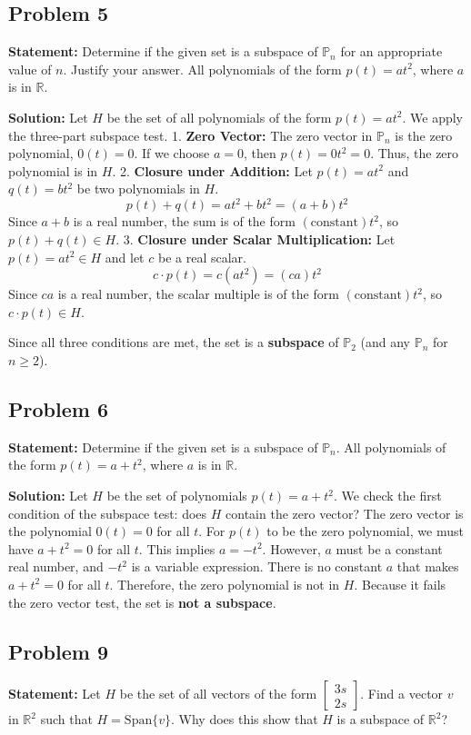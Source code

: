 \documentclass[12pt]{article}
\begin{document}
\subsection{Problem 5}
\textbf{Statement:} Determine if the given set is a subspace of $\mathbb{P}_n$ for an appropriate value of $n$. Justify your answer.
All polynomials of the form $p(t) = at^2$, where $a$ is in $\mathbb{R}$.

\textbf{Solution:}
Let $H$ be the set of all polynomials of the form $p(t) = at^2$. We apply the three-part subspace test.
1. \textbf{Zero Vector:} The zero vector in $\mathbb{P}_n$ is the zero polynomial, $0(t) = 0$. If we choose $a = 0$, then $p(t) = 0t^2 = 0$. Thus, the zero polynomial is in $H$.
2. \textbf{Closure under Addition:} Let $p(t) = at^2$ and $q(t) = bt^2$ be two polynomials in $H$.
\[ p(t) + q(t) = at^2 + bt^2 = (a+b)t^2 \]
Since $a+b$ is a real number, the sum is of the form $(\text{constant})t^2$, so $p(t) + q(t) \in H$.
3. \textbf{Closure under Scalar Multiplication:} Let $p(t) = at^2 \in H$ and let $c$ be a real scalar.
\[ c \cdot p(t) = c(at^2) = (ca)t^2 \]
Since $ca$ is a real number, the scalar multiple is of the form $(\text{constant})t^2$, so $c \cdot p(t) \in H$.

Since all three conditions are met, the set is a \textbf{subspace} of $\mathbb{P}_2$ (and any $\mathbb{P}_n$ for $n \ge 2$).

\subsection{Problem 6}
\textbf{Statement:} Determine if the given set is a subspace of $\mathbb{P}_n$.
All polynomials of the form $p(t) = a + t^2$, where $a$ is in $\mathbb{R}$.

\textbf{Solution:}
Let $H$ be the set of polynomials $p(t) = a + t^2$. We check the first condition of the subspace test: does $H$ contain the zero vector?
The zero vector is the polynomial $0(t) = 0$ for all $t$.
For $p(t)$ to be the zero polynomial, we must have $a + t^2 = 0$ for all $t$.
This implies $a = -t^2$. However, $a$ must be a constant real number, and $-t^2$ is a variable expression. There is no constant $a$ that makes $a + t^2 = 0$ for all $t$.
Therefore, the zero polynomial is not in $H$. 
Because it fails the zero vector test, the set is \textbf{not a subspace}.

\subsection{Problem 9}
\textbf{Statement:} Let $H$ be the set of all vectors of the form $\begin{bmatrix} 3s \\ 2s \end{bmatrix}$. Find a vector $v$ in $\mathbb{R}^2$ such that $H = \text{Span}\{v\}$. Why does this show that $H$ is a subspace of $\mathbb{R}^2$?
\end{document}
